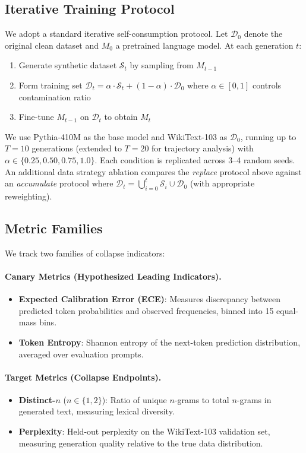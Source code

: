 \documentclass[letterpaper,11pt]{article}
\begin{document}
\subsection{Iterative Training Protocol}

We adopt a standard iterative self-consumption protocol.
Let $\mathcal{D}_0$ denote the original clean dataset and $M_0$ a pretrained language model.
At each generation $t$:
\begin{enumerate}
    \item Generate synthetic dataset $\mathcal{S}_t$ by sampling from $M_{t-1}$
    \item Form training set $\mathcal{D}_t = \alpha \cdot \mathcal{S}_t + (1-\alpha) \cdot \mathcal{D}_0$ where $\alpha \in [0,1]$ controls contamination ratio
    \item Fine-tune $M_{t-1}$ on $\mathcal{D}_t$ to obtain $M_t$
\end{enumerate}

We use Pythia-410M as the base model and WikiText-103 as $\mathcal{D}_0$, running up to $T=10$ generations (extended to $T=20$ for trajectory analysis) with $\alpha \in \{0.25, 0.50, 0.75, 1.0\}$.
Each condition is replicated across 3--4 random seeds.
An additional data strategy ablation compares the \emph{replace} protocol above against an \emph{accumulate} protocol where $\mathcal{D}_t = \bigcup_{i=0}^{t} \mathcal{S}_i \cup \mathcal{D}_0$ (with appropriate reweighting).

\subsection{Metric Families}

We track two families of collapse indicators:

\paragraph{Canary Metrics (Hypothesized Leading Indicators).}
\begin{itemize}
    \item \textbf{Expected Calibration Error (ECE)}: Measures discrepancy between predicted token probabilities and observed frequencies, binned into 15 equal-mass bins.
    \item \textbf{Token Entropy}: Shannon entropy of the next-token prediction distribution, averaged over evaluation prompts.
\end{itemize}

\paragraph{Target Metrics (Collapse Endpoints).}
\begin{itemize}
    \item \textbf{Distinct-$n$} ($n \in \{1,2\}$): Ratio of unique $n$-grams to total $n$-grams in generated text, measuring lexical diversity.
    \item \textbf{Perplexity}: Held-out perplexity on the WikiText-103 validation set, measuring generation quality relative to the true data distribution.
\end{itemize}
\end{document}
